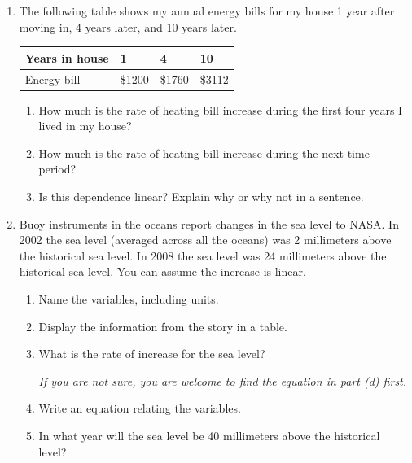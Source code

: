 \documentclass[12pt]{article}
\begin{document}
\begin{enumerate}

\item The following table shows my annual energy bills for my house 1 year after moving in, 4 years later, and 10 years later.

\begin{center}
\begin{tabular} {|l||l|l|l|} \hline
Years in house & 1 & 4 & 10  \\ \hline
Energy bill & \$1200 & \$1760 & \$3112 \\ \hline
\end{tabular}
\end{center}

\begin{enumerate}
\item How much is the rate of heating bill increase during the first four years I lived in my house?
\vfill
\item How much is the rate of heating bill increase during the next time period?
\vfill
\item Is this dependence linear? Explain why or why not in a sentence.
\vfill
\end{enumerate}

\newpage %
\item Buoy instruments in the oceans report changes in the sea level to NASA.  In 2002 the sea level (averaged across all the oceans) was 2 millimeters above the historical sea level.  In 2008 the sea level was 24 millimeters above the historical sea level.  You can assume the increase is linear.

\begin{enumerate}
\item Name the variables, including units.
\vfill
\item Display the information from the story in a table.
\vfill
\item What is the rate of increase for the sea level?

\emph{If you are not sure, you are welcome to find the equation in part (d) first.}
\vfill
\item Write an equation relating the variables.
\vfill
\item In what year will the sea level be 40 millimeters above the historical level?
\vfill
\end{enumerate}

\newpage


\end{enumerate}
\end{document}
